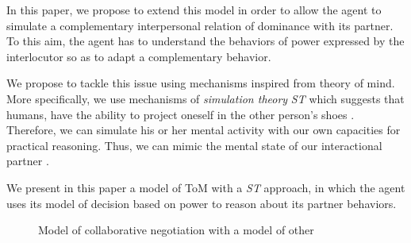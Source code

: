 \documentclass[sigconf]{aamas}  %
\begin{document}
	In this paper, we propose to extend this model in order to allow the agent to simulate a complementary interpersonal relation of dominance with its partner. To this aim, the agent has to understand the behaviors of power expressed by the interlocutor so as to adapt a complementary behavior.

	We propose to tackle this issue using mechanisms inspired from theory of mind. More specifically, we use mechanisms of \emph{simulation theory} \emph{ST} which suggests that humans, have the ability to project oneself in the other person’s shoes \cite{shanton2010simulation}. Therefore, we can simulate his or her mental activity with our own capacities for practical reasoning. 
	Thus, we can mimic the mental state of our interactional partner \cite{harbers2009modeling}.
	
	We present in this paper a model of ToM with a \emph{ST} approach, in which the agent uses its model of decision based on power to reason about its partner behaviors. 
	
	
	\begin{figure}
		\caption{Model of collaborative negotiation with a model of other} 
		\label{fig:schema-general}
	\end{figure} 

	
\end{document}
